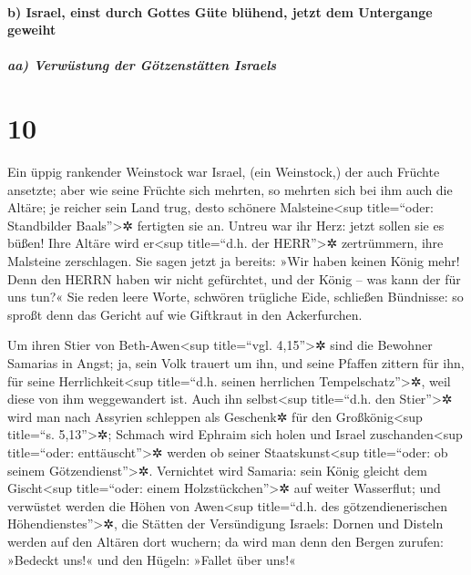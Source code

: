 \hypertarget{b-israel-einst-durch-gottes-guxfcte-bluxfchend-jetzt-dem-untergange-geweiht}{%
\paragraph{b) Israel, einst durch Gottes Güte blühend, jetzt dem
Untergange
geweiht}\label{b-israel-einst-durch-gottes-guxfcte-bluxfchend-jetzt-dem-untergange-geweiht}}

\hypertarget{aa-verwuxfcstung-der-guxf6tzenstuxe4tten-israels}{%
\subparagraph{aa) Verwüstung der Götzenstätten
Israels}\label{aa-verwuxfcstung-der-guxf6tzenstuxe4tten-israels}}

\hypertarget{section-9}{%
\section{10}\label{section-9}}

 Ein üppig rankender Weinstock war Israel, (ein
Weinstock,) der auch Früchte ansetzte; aber wie seine Früchte sich
mehrten, so mehrten sich bei ihm auch die Altäre; je reicher sein Land
trug, desto schönere Malsteine\textless sup title=``oder: Standbilder
Baals''\textgreater✲ fertigten sie an.  Untreu war ihr
Herz: jetzt sollen sie es büßen! Ihre Altäre wird er\textless sup
title=``d.h. der HERR''\textgreater✲ zertrümmern, ihre Malsteine
zerschlagen.  Sie sagen jetzt ja bereits: »Wir haben
keinen König mehr! Denn den HERRN haben wir nicht gefürchtet, und der
König -- was kann der für uns tun?«  Sie reden leere
Worte, schwören trügliche Eide, schließen Bündnisse: so sproßt denn das
Gericht auf wie Giftkraut in den Ackerfurchen.

 Um ihren Stier von Beth-Awen\textless sup title=``vgl.
4,15''\textgreater✲ sind die Bewohner Samarias in Angst; ja, sein Volk
trauert um ihn, und seine Pfaffen zittern für ihn, für seine
Herrlichkeit\textless sup title=``d.h. seinen herrlichen
Tempelschatz''\textgreater✲, weil diese von ihm weggewandert ist.
 Auch ihn selbst\textless sup title=``d.h. den
Stier''\textgreater✲ wird man nach Assyrien schleppen als Geschenk✲ für
den Großkönig\textless sup title=``s. 5,13''\textgreater✲; Schmach wird
Ephraim sich holen und Israel zuschanden\textless sup title=``oder:
enttäuscht''\textgreater✲ werden ob seiner Staatskunst\textless sup
title=``oder: ob seinem Götzendienst''\textgreater✲. 
Vernichtet wird Samaria: sein König gleicht dem Gischt\textless sup
title=``oder: einem Holzstückchen''\textgreater✲ auf weiter Wasserflut;
 und verwüstet werden die Höhen von Awen\textless sup
title=``d.h. des götzendienerischen Höhendienstes''\textgreater✲, die
Stätten der Versündigung Israels: Dornen und Disteln werden auf den
Altären dort wuchern; da wird man denn den Bergen zurufen: »Bedeckt
uns!« und den Hügeln: »Fallet über uns!«

